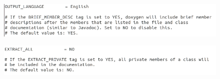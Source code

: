 \documentclass[12pt,a4paper]{article}
\begin{document}
\begin{figure}[H]
\centering
\includegraphics[scale=0.5]{./figures/35.png}
\caption{}
\end{figure}

\begin{figure}[H]
\centering
\includegraphics[scale=0.5]{./figures/36.png}
\caption{}
\end{figure}
\end{document}
